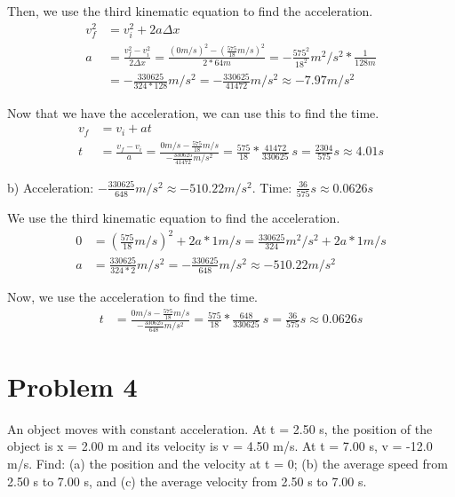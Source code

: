 \documentclass[12pt]{article}
\begin{document}
Then, we use the third kinematic equation to find the acceleration.
\begin{align*}
    v_f^2 &= v_i^2 + 2a\Delta x\\
    a &= \frac{v_f^2 - v_i^2}{2\Delta x} = \frac{(0 \unit{m/s})^2 - (\frac{575}{18} \unit{m/s})^2}{2*64\unit{m}} = -\frac{575^2}{18^2}\unit{m^2/s^2} * \frac{1}{128\unit{m}}\\
        &= -\frac{330625}{324 * 128}\unit{m/s^2} = \boxed{-\frac{330625}{41472}\unit{m/s^2} \approx -7.97 \unit{m/s^2}}
\end{align*}

Now that we have the acceleration, we can use this to find the time.
\begin{align*}
    v_f &= v_i + at\\
    t &= \frac{v_f - v_i}{a} = \frac{0\unit{m/s} - \frac{575}{18}\unit{m/s}}{-\frac{330625}{41472}\unit{m/s^2}} = \frac{575}{18}*\frac{41472}{330625}\ \unit{s} = \boxed{\frac{2304}{575} s \approx 4.01 \unit{s}}
\end{align*}

b) Acceleration: $-\frac{330625}{648}\unit{m/s^2} \approx -510.22 \unit{m/s^2}$.
Time: $\frac{36}{575} \unit{s} \approx 0.0626 \unit{s}$

We use the third kinematic equation to find the acceleration.
\begin{align*}
    0 &= (\frac{575}{18} \unit{m/s})^2 + 2a*1\unit{m/s} = \frac{330625}{324}\unit{m^2/s^2} + 2a*1\unit{m/s}\\
    a &= \frac{330625}{324*2}\unit{m/s^2} = \boxed{-\frac{330625}{648}\unit{m/s^2} \approx -510.22 \unit{m/s^2}}
\end{align*}

Now, we use the acceleration to find the time.
\begin{align*}
    t &= \frac{0\unit{m/s} - \frac{575}{18}\unit{m/s}}{-\frac{330625}{648}\unit{m/s^2}} = \frac{575}{18}*\frac{648}{330625}\ \unit{s} = \boxed{\frac{36}{575} \unit{s} \approx 0.0626 \unit{s}}
\end{align*}

\pagebreak

\section*{Problem 4}

An object moves with constant acceleration. At t = 2.50 s, the position of the object is
x = 2.00 m and its velocity is v = 4.50 m/s. At t = 7.00 s, v = -12.0 m/s. Find: (a) the
position and the velocity at t = 0; (b) the average speed from 2.50 s to 7.00 s, and (c) the
average velocity from 2.50 s to 7.00 s.
\end{document}
